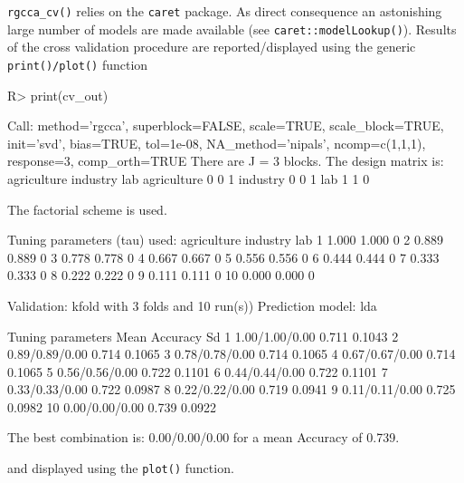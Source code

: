 \documentclass[
]{jss}
\begin{document}
\normalsize

\texttt{rgcca\_cv()} relies on the \texttt{caret} package. As direct
consequence an astonishing large number of models are made available
(see \texttt{caret::modelLookup()}). Results of the cross validation
procedure are reported/displayed using the generic
\texttt{print()/plot()} function

\footnotesize

\begin{CodeChunk}
\begin{CodeInput}
R> print(cv_out)
\end{CodeInput}
\begin{CodeOutput}
Call: method='rgcca', superblock=FALSE, scale=TRUE, scale_block=TRUE, init='svd',
bias=TRUE, tol=1e-08, NA_method='nipals', ncomp=c(1,1,1), response=3,
comp_orth=TRUE 
There are J = 3 blocks.
The design matrix is:
            agriculture industry lab
agriculture           0        0   1
industry              0        0   1
lab                   1        1   0

The factorial scheme is used.

Tuning parameters (tau) used: 
   agriculture industry lab
1        1.000    1.000   0
2        0.889    0.889   0
3        0.778    0.778   0
4        0.667    0.667   0
5        0.556    0.556   0
6        0.444    0.444   0
7        0.333    0.333   0
8        0.222    0.222   0
9        0.111    0.111   0
10       0.000    0.000   0

Validation: kfold with 3 folds and 10 run(s)) 
Prediction model: lda 

   Tuning parameters Mean Accuracy     Sd
1     1.00/1.00/0.00         0.711 0.1043
2     0.89/0.89/0.00         0.714 0.1065
3     0.78/0.78/0.00         0.714 0.1065
4     0.67/0.67/0.00         0.714 0.1065
5     0.56/0.56/0.00         0.722 0.1101
6     0.44/0.44/0.00         0.722 0.1101
7     0.33/0.33/0.00         0.722 0.0987
8     0.22/0.22/0.00         0.719 0.0941
9     0.11/0.11/0.00         0.725 0.0982
10    0.00/0.00/0.00         0.739 0.0922

The best combination is: 0.00/0.00/0.00 for a mean Accuracy of 0.739.
\end{CodeOutput}
\end{CodeChunk}

\normalsize

and displayed using the \texttt{plot()} function.

\footnotesize
\end{document}
